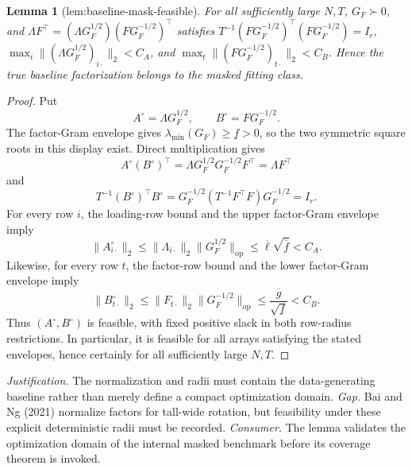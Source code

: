 \documentclass{article}
\newtheorem{lemma}{Lemma}
\begin{document}
\begin{lemma}[lem:baseline-mask-feasible]\label{lem:baseline-mask-feasible}
For all sufficiently large \(N,T\), \(G_F\succ0\), and \(\Lambda F^{\top}=(\Lambda G_F^{1/2})(FG_F^{-1/2})^{\top}\) satisfies \(T^{-1}(FG_F^{-1/2})^{\top}(FG_F^{-1/2})=I_r\), \(\max_i\|(\Lambda G_F^{1/2})_{i\cdot}\|_2<C_A\), and \(\max_t\|(FG_F^{-1/2})_{t\cdot}\|_2<C_B\). Hence the true baseline factorization belongs to the masked fitting class.
\end{lemma}
\begin{proof}
Put
\[
 A^\circ=\Lambda G_F^{1/2},\qquad B^\circ=F G_F^{-1/2}.
\]
The factor-Gram envelope gives \(\lambda_{\min}(G_F)\geq\underline f>0\), so the two symmetric square roots in this display exist.  Direct multiplication gives
\[
 A^\circ(B^\circ)^{\top}
 =\Lambda G_F^{1/2}G_F^{-1/2}F^{\top}
 =\Lambda F^{\top}
\]
and
\[
 T^{-1}(B^\circ)^{\top}B^\circ
 =G_F^{-1/2}(T^{-1}F^{\top}F)G_F^{-1/2}
 =I_r.
\]
For every row \(i\), the loading-row bound and the upper factor-Gram envelope imply
\[
 \|A^\circ_{i\cdot}\|_2
 \leq \|\Lambda_{i\cdot}\|_2\|G_F^{1/2}\|_{\mathrm{op}}
 \leq \overline\ell\sqrt{\overline f}<C_A.
\]
Likewise, for every row \(t\), the factor-row bound and the lower factor-Gram envelope imply
\[
 \|B^\circ_{t\cdot}\|_2
 \leq \|F_{t\cdot}\|_2\|G_F^{-1/2}\|_{\mathrm{op}}
 \leq \frac{\overline g}{\sqrt{\underline f}}<C_B.
\]
Thus \((A^\circ,B^\circ)\) is feasible, with fixed positive slack in both row-radius restrictions.  In particular, it is feasible for all arrays satisfying the stated envelopes, hence certainly for all sufficiently large \(N,T\).
\end{proof}
\par\smallskip\noindent \textit{Justification.} The normalization and radii must contain the data-generating baseline rather than merely define a compact optimization domain. \textit{Gap.} Bai and Ng (2021) normalize factors for tall-wide rotation, but feasibility under these explicit deterministic radii must be recorded. \textit{Consumer.} The lemma validates the optimization domain of the internal masked benchmark before its coverage theorem is invoked.
\end{document}
